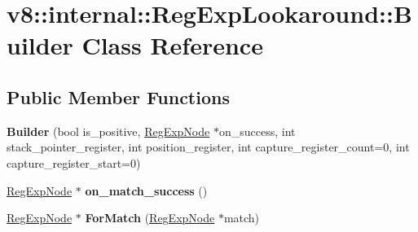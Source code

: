 \hypertarget{classv8_1_1internal_1_1_reg_exp_lookaround_1_1_builder}{}\section{v8\+:\+:internal\+:\+:Reg\+Exp\+Lookaround\+:\+:Builder Class Reference}
\label{classv8_1_1internal_1_1_reg_exp_lookaround_1_1_builder}
\subsection*{Public Member Functions}
\begin{DoxyCompactItemize}
\item 
{\bfseries Builder} (bool is\+\_\+positive, \hyperlink{classv8_1_1internal_1_1_reg_exp_node}{Reg\+Exp\+Node} $\ast$on\+\_\+success, int stack\+\_\+pointer\+\_\+register, int position\+\_\+register, int capture\+\_\+register\+\_\+count=0, int capture\+\_\+register\+\_\+start=0)\hypertarget{classv8_1_1internal_1_1_reg_exp_lookaround_1_1_builder_af156f4154e654d4f3f1d53008a2a429e}{}\label{classv8_1_1internal_1_1_reg_exp_lookaround_1_1_builder_af156f4154e654d4f3f1d53008a2a429e}

\item 
\hyperlink{classv8_1_1internal_1_1_reg_exp_node}{Reg\+Exp\+Node} $\ast$ {\bfseries on\+\_\+match\+\_\+success} ()\hypertarget{classv8_1_1internal_1_1_reg_exp_lookaround_1_1_builder_ae67317814d092e2f63b225745cc84b2a}{}\label{classv8_1_1internal_1_1_reg_exp_lookaround_1_1_builder_ae67317814d092e2f63b225745cc84b2a}

\item 
\hyperlink{classv8_1_1internal_1_1_reg_exp_node}{Reg\+Exp\+Node} $\ast$ {\bfseries For\+Match} (\hyperlink{classv8_1_1internal_1_1_reg_exp_node}{Reg\+Exp\+Node} $\ast$match)\hypertarget{classv8_1_1internal_1_1_reg_exp_lookaround_1_1_builder_aa532a5c308b557b9e7e0f68ee8dd679a}{}\label{classv8_1_1internal_1_1_reg_exp_lookaround_1_1_builder_aa532a5c308b557b9e7e0f68ee8dd679a}

\end{DoxyCompactItemize}
